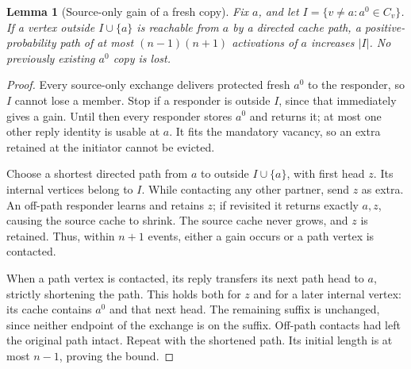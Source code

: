 \documentclass[11pt]{article}
\newtheorem{lemma}[theorem]{Lemma}
\begin{document}
\begin{lemma}[Source-only gain of a fresh copy]
\label{lem:c2sourcegain}
Fix $a$, and let $I=\{v\ne a:a^0\in C_v\}$.
If a vertex outside $I\cup\{a\}$ is reachable from $a$
by a directed cache path, a positive-probability path of
at most $(n-1)(n+1)$ activations of $a$ increases $|I|$.
No previously existing $a^0$ copy is lost.
\end{lemma}
\begin{proof}
Every source-only exchange delivers protected fresh $a^0$
to the responder, so $I$ cannot lose a member. Stop if a
responder is outside $I$, since that immediately gives a gain.
Until then every responder stores $a^0$ and returns it;
at most one other reply identity is usable at $a$.
It fits the mandatory vacancy, so an extra retained at
the initiator cannot be evicted.

Choose a shortest directed path from $a$ to outside
$I\cup\{a\}$, with first head $z$. Its internal vertices
belong to $I$. While contacting any other partner, send
$z$ as extra. An off-path responder learns and retains
$z$; if revisited it returns exactly $a,z$, causing the
source cache to shrink. The source cache never grows,
and $z$ is retained. Thus, within $n+1$ events, either
a gain occurs or a path vertex is contacted.

When a path vertex is contacted, its reply transfers its
next path head to $a$, strictly shortening the path.
This holds both for $z$ and for a later internal vertex:
its cache contains $a^0$ and that next head. The remaining
suffix is unchanged, since neither endpoint of the exchange
is on the suffix. Off-path contacts had left the original
path intact. Repeat with the shortened path. Its initial
length is at most $n-1$, proving the bound.
\end{proof}
\end{document}
